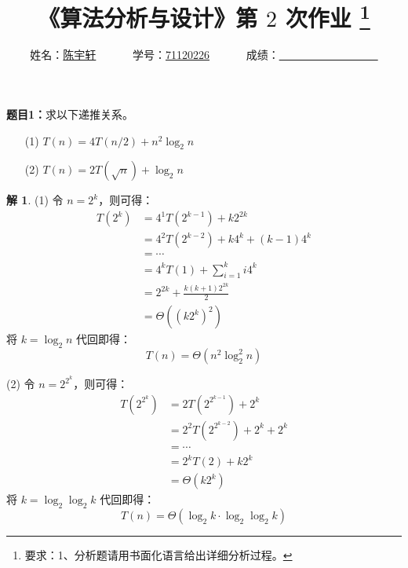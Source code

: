 \documentclass[12pt,a4paper]{ctexart}
\theoremstyle{definition}
\newtheorem*{solution}{解}
\begin{document}

\title{
{\heiti《算法分析与设计》第 $2$ 次作业
\footnote{要求：1、分析题请用书面化语言给出详细分析过程。}
}
}
\date{}

\author{
    姓名：\underline{陈宇轩}~~~~~~
    学号：\underline{71120226}~~~~~~
    成绩：\underline{~~~~~~~~~~~~~~~~~~}
}

\maketitle

\noindent
\section*{\bf \color{red}{算法分析题}}

\noindent
{\bf 题目1：}求以下递推关系。
\begin{enumerate}
    \item[(1)]  $T(n)=4T(n/2)+n^{2}\log_{2}{n}$
    \item[(2)]  $T(n)=2T(\sqrt{n})+\log_{2}{n}$
\end{enumerate}

\vspace{5pt}
\noindent
    
\begin{solution}
    (1) 令 $n = 2^k$，则可得：
    \begin{align*}
        T(2^k) &= 4^1 T(2^{k-1}) + k2^{2k} \\
        &= 4^2 T(2^{k-2}) + k4^k + (k-1)4^k \\
        &= \cdots \\
        &= 4^k T(1) + \sum_{i=1}^{k}i4^k \\
        &= 2^{2k} + \frac{k(k+1)2^{2k}}{2} \\
        &= \Theta((k2^k)^2) 
    \end{align*}
    将 $k = \log_2 n$ 代回即得：
    \[
        T(n) = \Theta(n^2\log^2_2n)
    \]

    (2) 令 $n = 2^{2^k}$，则可得：
    \begin{align*}
        T(2^{2^k}) &= 2T(2^{2^{k-1}}) + 2^k \\
        &= 2^2T(2^{2^{k-2}}) + 2^k + 2^k \\
        &= \cdots \\
        &= 2^kT(2) + k2^k \\
        &= \Theta(k2^k)
    \end{align*}
    将 $k = \log_2 \log_2 k$ 代回即得：
    \[
        T(n) = \Theta(\log_2k \cdot \log_2\log_2k)
    \]
\end{solution}
\end{document}
